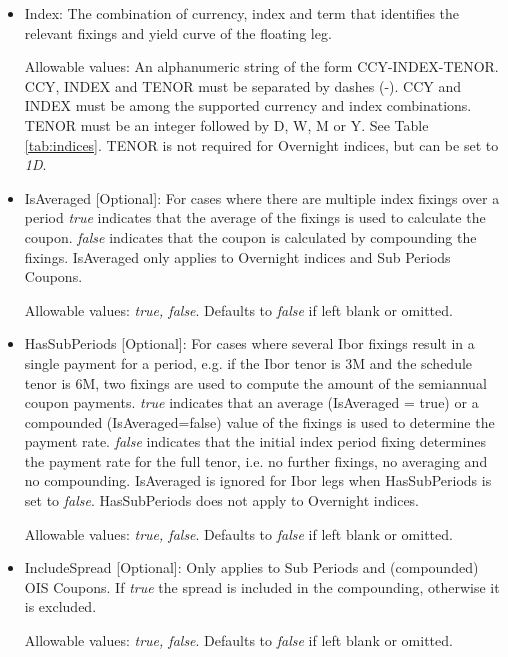 \begin{itemize}
\item Index:  The combination of currency, index and term that
  identifies the relevant fixings and yield curve of the floating leg.  

  Allowable values: An alphanumeric string of the form CCY-INDEX-TENOR. CCY, INDEX and TENOR must be separated by dashes (-). CCY and INDEX must be among the supported currency and index combinations. TENOR must be an integer followed by D, W,
  M or Y. See Table \ref{tab:indices}. TENOR is not required for Overnight indices, but can be set to \emph{1D}.

\item IsAveraged [Optional]:  For cases where there are multiple index fixings over a period \emph{true} indicates that
  the average of the fixings is used to calculate the coupon.  \emph{false} indicates that the coupon is calculated by
  compounding the fixings.  IsAveraged only applies to Overnight indices and Sub Periods Coupons.

Allowable values:  \emph{true, false}. Defaults to \emph{false} if left blank or omitted.

\item HasSubPeriods [Optional]: For cases where several Ibor fixings result in a single payment for a period, e.g. if
  the Ibor tenor is 3M and the schedule tenor is 6M, two fixings are used to compute the amount of the semiannual coupon
  payments. \emph{true} indicates that an average (IsAveraged = true) or a compounded (IsAveraged=false) value of the
  fixings is used to determine the payment rate.  \emph{false} indicates that the initial index period fixing determines the payment rate for the 
  full tenor, i.e. no further fixings, no averaging and no compounding. IsAveraged is ignored for Ibor legs when HasSubPeriods is set to  \emph{false}.
  HasSubPeriods does not apply to Overnight indices. 

Allowable values:  \emph{true, false}. Defaults to \emph{false} if left blank or omitted.

\item IncludeSpread [Optional]: Only applies to Sub Periods and (compounded) OIS Coupons. If \emph{true} the spread is
  included in the compounding, otherwise it is excluded.

Allowable values:  \emph{true, false}. Defaults to \emph{false} if left blank or omitted.


\end{itemize}
